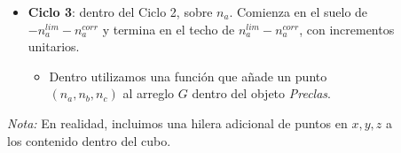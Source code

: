 \documentclass[dvisvgm,11pt,aspectratio=169]{beamer}
\begin{document}
\begin{frame}
\begin{columns}
\begin{column}{0.6\textwidth}
\begin{itemize}
\item \textbf{Ciclo 3}: dentro del Ciclo 2, sobre $n_a$. Comienza en el suelo de $-n_a^{lim}-n_a^{corr}$ y termina en el techo de $n_a^{lim}-n_a^{corr}$, con incrementos unitarios.
\begin{itemize}
\item Dentro utilizamos una función que añade un punto $(n_a,n_b,n_c)$ al arreglo $G$ dentro del objeto \textit{Preclas}.
\end{itemize}
\end{itemize}

\textit{Nota:} En realidad, incluimos una hilera adicional de puntos en $x,y,z$ a los contenido dentro del cubo.
\end{column}
\begin{column}{0.35\textwidth}
\begin{figure}

\end{figure}
\end{column}
\end{columns}
\end{frame}
\end{document}

